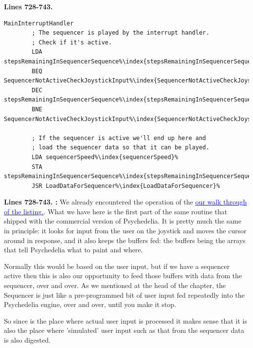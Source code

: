 \textbf{Lines 728-743. }
\begin{lstlisting}[escapechar=\%]
MainInterruptHandler
        ; The sequencer is played by the interrupt handler.
        ; Check if it's active.
        LDA stepsRemainingInSequencerSequence%\index{stepsRemainingInSequencerSequence}%
        BEQ SequencerNotActiveCheckJoystickInput%\index{SequencerNotActiveCheckJoystickInput}%
        DEC stepsRemainingInSequencerSequence%\index{stepsRemainingInSequencerSequence}%
        BNE SequencerNotActiveCheckJoystickInput%\index{SequencerNotActiveCheckJoystickInput}%

        ; If the sequencer is active we'll end up here and
        ; load the sequencer data so that it can be played.
        LDA sequencerSpeed%\index{sequencerSpeed}%
        STA stepsRemainingInSequencerSequence%\index{stepsRemainingInSequencerSequence}%
        JSR LoadDataForSequencer%\index{LoadDataForSequencer}%
\end{lstlisting}

\clearpage

\textbf{Lines 728-743. :} We already encountered the operation of the  
\hyperref[sec:listing_commentary]{\textcolor{blue}{ our walk through of the listing.}}. What we have here is the first part of the same routine
that shipped with the commercial version of Psychedelia. It is pretty much the same in principle: it looks for input from the user on the joystick
and moves the cursor around in response, and it also keeps the buffers fed: the buffers being the arrays that tell Psychedelia what to paint and where.

Normally this would be based on the user input, but if we have a sequencer active then this is also our opportunity to feed those buffers with data from 
the sequencer, over and over. As we mentioned at the head of the chapter, the Sequencer is just like a pre-programmed bit of user input fed repeatedly
into the Psychedelia engine, over and over, until you make it stop. 

So since  is the place where actual user input is processed it makes sense that it is also the place where 'simulated' user
input such as that from the sequencer data is also digested.

